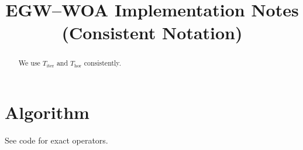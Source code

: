 \documentclass{ieeeaccess}
\begin{document}
\title{EGW--WOA Implementation Notes (Consistent Notation)}
\begin{abstract}We use $T_{\mathrm{iter}}$ and $T_{\mathrm{hor}}$ consistently.\end{abstract}
\section{Algorithm}
See code for exact operators.
\end{document}
